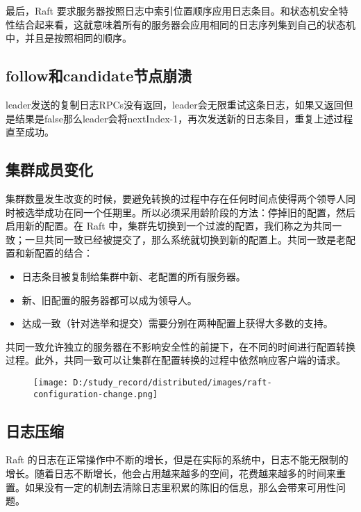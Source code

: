 \documentclass[
]{article}
\begin{document}
最后，Raft
要求服务器按照日志中索引位置顺序应用日志条目。和状态机安全特性结合起来看，这就意味着所有的服务器会应用相同的日志序列集到自己的状态机中，并且是按照相同的顺序。

\hypertarget{header-n206}{%
\subsection{follow和candidate节点崩溃}\label{header-n206}}

leader发送的复制日志RPCs没有返回，leader会无限重试这条日志，如果又返回但是结果是false那么leader会将nextIndex-1，再次发送新的日志条目，重复上述过程直至成功。

\hypertarget{header-n209}{%
\subsection{集群成员变化}\label{header-n209}}

集群数量发生改变的时候，要避免转换的过程中存在任何时间点使得两个领导人同时被选举成功在同一个任期里。所以必须采用龄阶段的方法：停掉旧的配置，然后启用新的配置。在
Raft
中，集群先切换到一个过渡的配置，我们称之为共同一致；一旦共同一致已经被提交了，那么系统就切换到新的配置上。共同一致是老配置和新配置的结合：

\begin{itemize}
\item
  日志条目被复制给集群中新、老配置的所有服务器。
\item
  新、旧配置的服务器都可以成为领导人。
\item
  达成一致（针对选举和提交）需要分别在两种配置上获得大多数的支持。
\end{itemize}

共同一致允许独立的服务器在不影响安全性的前提下，在不同的时间进行配置转换过程。此外，共同一致可以让集群在配置转换的过程中依然响应客户端的请求。

\begin{figure}
\centering
\texttt{[image: D:/study\_record/distributed/images/raft-configuration-change.png]}
\caption{}
\end{figure}

\hypertarget{header-n221}{%
\subsection{日志压缩}\label{header-n221}}

Raft
的日志在正常操作中不断的增长，但是在实际的系统中，日志不能无限制的增长。随着日志不断增长，他会占用越来越多的空间，花费越来越多的时间来重置。如果没有一定的机制去清除日志里积累的陈旧的信息，那么会带来可用性问题。
\end{document}
